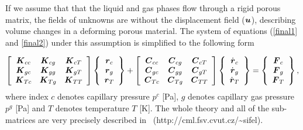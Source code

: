 If we assume that that the liquid and gas phases flow through a rigid porous 
matrix, the fields of unknowns are without the displacement field ($\mbox{\boldmath$u$}$), 
describing volume changes in a deforming porous material. 
The system of equations (\eqref{final1} and \eqref{final2}) under this assumption is simplified to the following form

\begin{eqnarray}
\left[ \begin{array}{ccc}
\mbox{\boldmath$K$}_{cc} & \mbox{\boldmath$K$}_{cg} & \mbox{\boldmath$K$}_{cT} \\
\mbox{\boldmath$K$}_{gc} & \mbox{\boldmath$K$}_{gg} & \mbox{\boldmath$K$}_{gT} \\
\mbox{\boldmath$K$}_{Tc} & \mbox{\boldmath$K$}_{Tg} & \mbox{\boldmath$K$}_{TT}
\end{array} \right]
\left\{ \begin{array}{c}
\mbox{\boldmath$r$}_c \\
\mbox{\boldmath$r$}_g \\
\mbox{\boldmath$r$}_T
\end{array} \right\} + 
\left[ \begin{array}{ccc}
\mbox{\boldmath$C$}_{cc} & \mbox{\boldmath$C$}_{cg} & \mbox{\boldmath$C$}_{cT} \\
\mbox{\boldmath$C$}_{gc} & \mbox{\boldmath$C$}_{gg} & \mbox{\boldmath$C$}_{gT} \\
\mbox{\boldmath$C$}_{Tc} & \mbox{\boldmath$C$}_{Tg} & \mbox{\boldmath$C$}_{TT}
\end{array} \right]
\left\{ \begin{array}{c}
\dot{\mbox{\boldmath$r$}}_c \\
\dot{\mbox{\boldmath$r$}}_g \\
\dot{\mbox{\boldmath$r$}}_T
\end{array} \right\} = 
\left\{ \begin{array}{c}
\mbox{\boldmath$F$}_c \\
\mbox{\boldmath$F$}_g \\
\mbox{\boldmath$F$}_T
\end{array} \right\},\nonumber\\
\end{eqnarray}
where index $c$ denotes capillary pressure $p^c$ [Pa], $g$ denotes capillary gas pressure $p^g$ [Pa] and 
$T$ denotes temperature $T$ [K].
The whole theory and all of the sub-matrices are very precisely described in~\cite{pesavento}
(\textsf {http://cml.fsv.cvut.cz/\~{}sifel}).